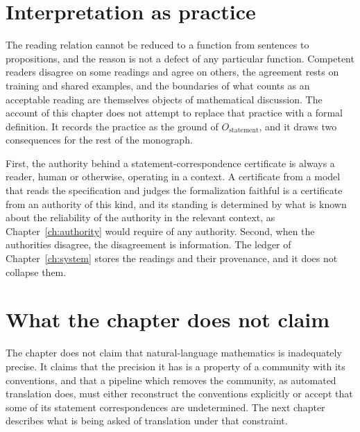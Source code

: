 \section{Interpretation as practice}

The reading relation cannot be reduced to a function from sentences to propositions, and the reason is not a defect of any particular function. Competent readers disagree on some readings and agree on others, the agreement rests on training and shared examples, and the boundaries of what counts as an acceptable reading are themselves objects of mathematical discussion. The account of this chapter does not attempt to replace that practice with a formal definition. It records the practice as the ground of $O_{\mathrm{statement}}$, and it draws two consequences for the rest of the monograph.

First, the authority behind a statement-correspondence certificate is always a reader, human or otherwise, operating in a context. A certificate from a model that reads the specification and judges the formalization faithful is a certificate from an authority of this kind, and its standing is determined by what is known about the reliability of the authority in the relevant context, as Chapter~\ref{ch:authority} would require of any authority. Second, when the authorities disagree, the disagreement is information. The ledger of Chapter~\ref{ch:system} stores the readings and their provenance, and it does not collapse them.

\section{What the chapter does not claim}

The chapter does not claim that natural-language mathematics is inadequately precise. It claims that the precision it has is a property of a community with its conventions, and that a pipeline which removes the community, as automated translation does, must either reconstruct the conventions explicitly or accept that some of its statement correspondences are undetermined. The next chapter describes what is being asked of translation under that constraint.
